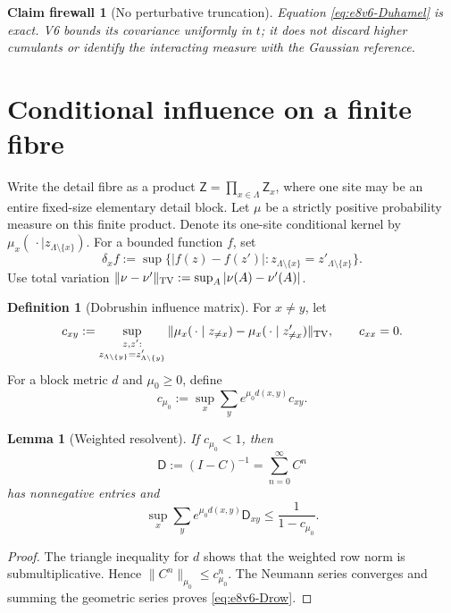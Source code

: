 \documentclass[11pt,oneside]{book}
\newtheorem{lemma}[theorem]{Lemma}
\newtheorem{firewall}[theorem]{Claim firewall}
\theoremstyle{definition}
\newtheorem{definition}[theorem]{Definition}
\theoremstyle{remark}
\begin{document}
\begin{firewall}[No perturbative truncation]
\label{fire:e8v6-interpolation}
Equation \eqref{eq:e8v6-Duhamel} is exact.  V6 bounds its covariance
uniformly in \(t\); it does not discard higher cumulants or identify
the interacting measure with the Gaussian reference.
\end{firewall}

\section{Conditional influence on a finite fibre}
\label{sec:e8v6-influence}

Write the detail fibre as a product
\(\mathsf Z=\prod_{x\in\Lambda}\mathsf Z_x\), where one site may be an
entire fixed-size elementary detail block.  Let
\(\mu\) be a strictly positive probability measure on this finite
product.  Denote its one-site conditional kernel by
\(\mu_x(\,\cdot\mid z_{\Lambda\setminus\{x\}})\).
For a bounded function \(f\), set
\[
 \delta_x f:=
 \sup\{|f(z)-f(z')|:z_{\Lambda\setminus\{x\}}
                         =z'_{\Lambda\setminus\{x\}}\}.              \label{eq:e8v6-delta}
\]
Use total variation
\(\|\nu-\nu'\|_{\rm TV}:=\sup_A|\nu(A)-\nu'(A)|\).

\begin{definition}[Dobrushin influence matrix]
\label{def:e8v6-Dobrushin}
For \(x\ne y\), let
\[
 c_{xy}:=\sup_{\substack{z,z':\\
 z_{\Lambda\setminus\{y\}}=z'_{\Lambda\setminus\{y\}}}}
 \|\mu_x(\,\cdot\mid z_{\ne x})
  -\mu_x(\,\cdot\mid z'_{\ne x})\|_{\rm TV},
 \qquad c_{xx}=0.                                    \label{eq:e8v6-cxy}
\]
For a block metric \(d\) and \(\mu_0\ge0\), define
\[
 c_{\mu_0}:=
 \sup_x\sum_y e^{\mu_0d(x,y)}c_{xy}.                 \label{eq:e8v6-cmu}
\]
\end{definition}

\begin{lemma}[Weighted resolvent]
\label{lem:e8v6-resolvent}
If \(c_{\mu_0}<1\), then
\[
 {\mathsf D}:=(I-C)^{-1}=\sum_{n=0}^\infty C^n       \label{eq:e8v6-D}
\]
has nonnegative entries and
\[
 \sup_x\sum_y e^{\mu_0d(x,y)}{\mathsf D}_{xy}
 \le\frac1{1-c_{\mu_0}}.                             \label{eq:e8v6-Drow}
\]
\end{lemma}

\begin{proof}
The triangle inequality for \(d\) shows that the weighted row norm is
submultiplicative.  Hence
\(\|C^n\|_{\mu_0}\le c_{\mu_0}^n\).  The Neumann series converges and
summing the geometric series proves \eqref{eq:e8v6-Drow}.
\end{proof}
\end{document}
